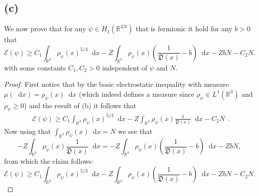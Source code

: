 \documentclass[a4paper,11pt]{article}
\newcommand*\diff{\mathop{}\!\mathrm{d}}
\newcommand{\R}{\mathbb{R}}
\numberwithin{equation}{section}
\begin{document}
 \subsection*{(c)}
 We now prove that for any $ \psi\in H_1(\R^{3N}) $ that is fermionic it hold for any $ b>0$ that \begin{equation}
 \mathcal{E}(\psi)\geq C_1\int_{\R^3}\rho_\psi(x)^{5/3}\diff x-Z\int_{\R^3}\rho_\psi(x)\left(\frac{1}{\mathfrak{D}(x)}-b\right)\diff x-ZbN-C_2N.
 \end{equation} 
 with some constants $ C_1,C_2>0 $ independent of $ \psi $ and $ N $.
 \begin{proof}
 	First notice that by the basic electrostatic inequality with measure $ \mu(\diff x)=\rho_\psi(x)\diff x $ (which indeed defines a measure since $\rho_\psi\in L^1(\R^3)$ and $ \rho_\psi\geq0 $) and the result of (b) it follows that\begin{equation}
 	\begin{aligned}
 	\mathcal{E}(\psi)\geq C_1\int_{\R^3}\rho_\psi(x)^{5/3}\diff x-Z\int_{\R^3}\rho_\psi(x)\frac{1}{\mathfrak{D}(x)}\diff x-C_2N
 	\end{aligned}.
 	\end{equation}
 	Now using that $ \int_{\R^3}\rho_\psi(x) \diff x=N $ we see that \begin{equation}
 	-Z\int_{\R^3}\rho_\psi(x)\frac{1}{\mathfrak{D}(x)}\diff x=-Z\int_{\R^3}\rho_\psi(x)\left(\frac{1}{\mathfrak{D}(x)}-b\right)\diff x-ZbN,
 	\end{equation}
 	from which the claim follows:\begin{equation}
 	\mathcal{E}(\psi)\geq C_1\int_{\R^3}\rho_\psi(x)^{5/3}\diff x-Z\int_{\R^3}\rho_\psi(x)\left(\frac{1}{\mathfrak{D}(x)}-b\right)\diff x-ZbN-C_2N.\label{EnergyEst1}
 	\end{equation}
 \end{proof}
\end{document}
